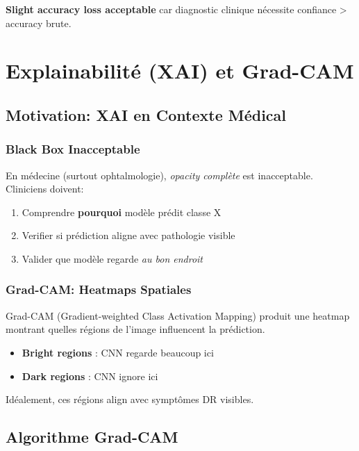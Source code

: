 \documentclass[12pt,a4paper,oneside]{report}
\begin{document}
\textbf{Slight accuracy loss acceptable} car diagnostic clinique 
nécessite confiance > accuracy brute.

\newpage


\chapter{Explainabilité (XAI) et Grad-CAM}

\section{Motivation: XAI en Contexte Médical}

\subsection{Black Box Inacceptable}

En médecine (surtout ophtalmologie), \textit{opacity complète} 
est inacceptable. Cliniciens doivent:
\begin{enumerate}
    \item Comprendre \textbf{pourquoi} modèle prédit classe X
    \item Verifier si prédiction aligne avec pathologie visible
    \item Valider que modèle regarde \textit{au bon endroit}
\end{enumerate}

\subsection{Grad-CAM: Heatmaps Spatiales}

Grad-CAM (Gradient-weighted Class Activation Mapping) produit une 
heatmap montrant quelles régions de l'image influencent la prédiction.

\begin{itemize}
    \item \textbf{Bright regions} : CNN regarde beaucoup ici
    \item \textbf{Dark regions} : CNN ignore ici
\end{itemize}

Idéalement, ces régions align avec symptômes DR visibles.

\section{Algorithme Grad-CAM}
\end{document}
